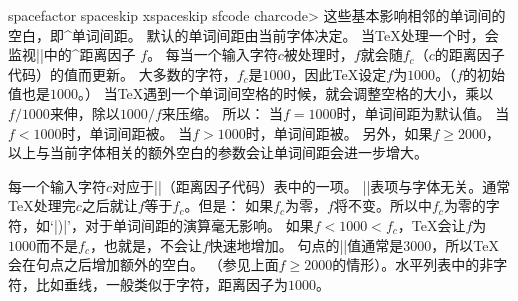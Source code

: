\begindesc
\cts spacefactor {}
\cts spaceskip {}
\cts xspaceskip {}
\cts sfcode {\<charcode> }
\explain
这些基本影响相邻的单词间的空白，即^{单词间距}。
默认的单词间距由当前字体决定。
当\TeX{}处理一个时，会监视|\spacefactor|中的^{距离因子} $f$。
每当一个输入字符$c$被处理时，$f$就会随$f_c$（$c$的距离因子代码）的值而更新。
大多数的字符，$f_c$是$1000$，因此\TeX{}设定$f$为$1000$。（$f$的初始值也是$1000$。）
当\TeX{}遇到一个单词间空格的时候，就会调整空格的大小，乘以$f/1000$来伸，除以$1000/f$来压缩。
所以：
\olist\compact
\li 当$f=1000$时，单词间距为默认值。
\li 当$f<1000$时，单词间距被。
\li 当$f>1000$时，单词间距被。
\endolist
另外，如果$f\ge2000$，以上与当前字体相关的额外空白的参数会让单词间距会进一步增大。


每一个输入字符$c$对应于|\sfcode|（距离因子代码）表中的一项。
|\sfcode|表项与字体无关。通常\TeX{}处理完$c$之后就让$f$等于$f_c$。但是：
\ulist
\li 如果$f_c$为零，$f$将不变。所以\plainTeX{}中$f_c$为零的字符，如`|)|'，对于单词间距的演算毫无影响。
\li 如果$f<1000<f_c$，\TeX{}会让$f$为$1000$而不是$f_c$，也就是，不会让$f$快速地增加。
\endulist
句点的|\sfcode|值通常是$3000$，所以\TeX{}会在句点之后增加额外的空白。
（参见上面$f\ge2000$的情形）。水平列表中的非字符，比如垂线，一般类似于字符，距离因子为$1000$。

%




